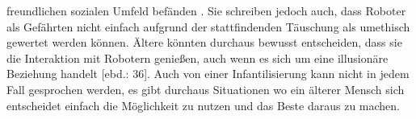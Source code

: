 freundlichen sozialen Umfeld befänden \cite[S. 34]{sharky}. Sie schreiben jedoch auch, dass Roboter als Gefährten nicht einfach aufgrund der stattfindenden Täuschung als umethisch gewertet werden können. Ältere könnten durchaus bewusst entscheiden, dass sie die Interaktion mit Robotern genießen, auch wenn es sich um eine illusionäre Beziehung handelt [ebd.: 36]. Auch von einer Infantilisierung kann nicht in jedem Fall gesprochen werden, es gibt durchaus Situationen wo ein älterer Mensch sich entscheidet einfach die Möglichkeit zu nutzen und das Beste daraus zu machen.


